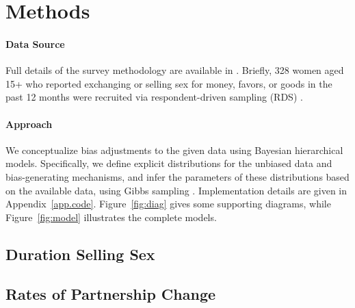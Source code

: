 \section{Methods}\label{meth}
\paragraph{Data Source}
Full details of the survey methodology are available in \cite{Yam2013}.
Briefly, 328 women aged 15+
who reported exchanging or selling sex for money, favors, or goods in the past 12 months
were recruited via respondent-driven sampling (RDS) \cite{Heckathorn1997}.
\paragraph{Approach}
We conceptualize bias adjustments to the given data using Bayesian hierarchical models.
Specifically, we define explicit distributions for the unbiased data and bias-generating mechanisms,
and infer the parameters of these distributions based on the available data,
using Gibbs sampling \cite{Geman1984}.
Implementation details are given in Appendix~\ref{app.code}.
Figure~\ref{fig:diag} gives some supporting diagrams, while
Figure~\ref{fig:model} illustrates the complete models.

\subsection{Duration Selling Sex}\label{meth.yss}


\subsection{Rates of Partnership Change}\label{meth.parts}


